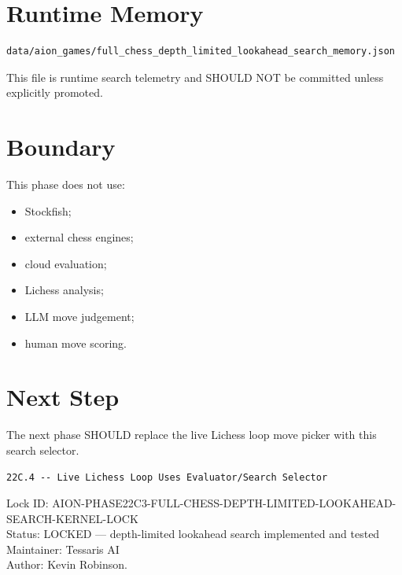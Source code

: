 \documentclass[11pt,a4paper]{article}
\begin{document}
\section{Runtime Memory}

\begin{verbatim}
data/aion_games/full_chess_depth_limited_lookahead_search_memory.json
\end{verbatim}

This file is runtime search telemetry and SHOULD NOT be committed unless explicitly promoted.

\section{Boundary}

This phase does not use:

\begin{itemize}
  \item Stockfish;
  \item external chess engines;
  \item cloud evaluation;
  \item Lichess analysis;
  \item LLM move judgement;
  \item human move scoring.
\end{itemize}

\section{Next Step}

The next phase SHOULD replace the live Lichess loop move picker with this search selector.

\begin{verbatim}
22C.4 -- Live Lichess Loop Uses Evaluator/Search Selector
\end{verbatim}

\bigskip

\noindent
Lock ID: AION-PHASE22C3-FULL-CHESS-DEPTH-LIMITED-LOOKAHEAD-SEARCH-KERNEL-LOCK\\
Status: LOCKED --- depth-limited lookahead search implemented and tested\\
Maintainer: Tessaris AI\\
Author: Kevin Robinson.
\end{document}
